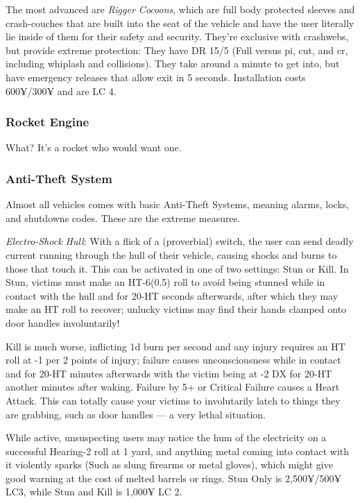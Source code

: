 \begin{multicols*}{2}
	The most advanced are \textit{Rigger Cocoons}, which are full body protected sleeves and crash-couches that are built into the seat of the vehicle and have the user literally lie inside of them for their safety and security. They're exclusive with crashwebs, but provide extreme protection: They have DR 15/5 (Full versus pi, cut, and cr, including whiplash and collisions). They take around a minute to get into, but have emergency releases that allow exit in 5 seconds. Installation costs 600¥/300¥ and are LC 4. 
	
	\subsubsection{Rocket Engine}
	
	What? It's a rocket who would want one. %
 	
	\subsubsection{Anti-Theft System}
	
	Almost all vehicles comes with basic Anti-Theft Systems, meaning alarms, locks, and shutdowns codes. These are the extreme measures.
	
	\textit{Electro-Shock Hull}: With a flick of a (proverbial) switch, the user can send deadly current running through the hull of their vehicle, causing shocks and burns to those that touch it. This can be activated in one of two settings: Stun or Kill. In Stun, victims must make an HT-6(0.5) roll to avoid being stunned while in contact with the hull and for 20-HT seconds afterwards, after which they may make an HT roll to recover; unlucky victims may find their hands clamped onto door handles involuntarily! 
	
	Kill is much worse, inflicting 1d burn per second and any injury requires an HT roll at -1 per 2 points of injury; failure causes unconsciousness while in contact and for 20-HT minutes afterwards with the victim being at -2 DX for 20-HT another minutes after waking. Failure by 5+ or Critical Failure causes a Heart Attack. This can totally cause your victims to involutarily latch to things they are grabbing, such as door handles — a very lethal situation.
	
	While active, unsuspecting users may notice the hum of the electricity on a successful Hearing-2 roll at 1 yard, and anything metal coming into contact with it violently sparks (Such as slung firearms or metal gloves), which might give good warning at the cost of melted barrels or rings. Stun Only is 2,500¥/500¥ LC3, while Stun and Kill is 1,000¥ LC 2.
	

\end{multicols*}
